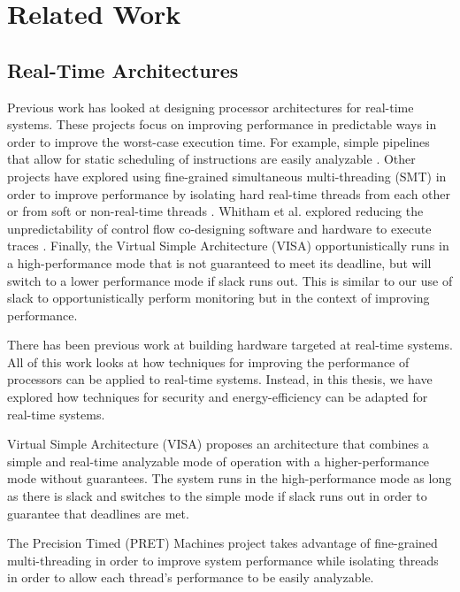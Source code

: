 \chapter{Related Work}
\label{chap:related_work}

\section{Real-Time Architectures}
\label{sec:related_work.realtime}

Previous work has looked at designing processor architectures for real-time
systems. These projects focus on improving performance in predictable ways in
order to improve the worst-case execution time. For example, simple pipelines
that allow for static scheduling of instructions are easily analyzable
\cite{spear-ecrts03, mcgrep-rtss06, jop-jsa07, patmos-ppes2011}. Other projects
have explored using fine-grained simultaneous multi-threading (SMT) in order to
improve performance by isolating hard real-time threads from each other
\cite{pret-dac07, pret-cases08, ptarm-iccd12} or from soft or non-real-time
threads \cite{merasa-micro10, carcores-arcs10, flexpret-rtas14}. Whitham et al.
explored reducing the unpredictability of control flow co-designing software
and hardware to execute traces \cite{whitham-comp10}. Finally, the Virtual
Simple Architecture (VISA) \cite{visa-isca03, multi_task_visa-rtss04}
opportunistically runs in a high-performance mode that is not guaranteed to
meet its deadline, but will switch to a lower performance mode if slack runs
out. This is similar to our use of slack to opportunistically perform
monitoring but in the context of improving performance.

There has been previous work at building hardware targeted at real-time
systems. All of this work looks at how techniques for improving the performance
of processors can be applied to real-time systems. Instead, in this thesis, we
have explored how techniques for security and energy-efficiency can be adapted
for real-time systems.

Virtual Simple Architecture (VISA) \cite{visa-isca03,
multi_task_visa-rtss04} proposes an architecture that combines a simple and
real-time analyzable mode of operation with a higher-performance mode
without guarantees. The system runs in the high-performance mode as long as
there is slack and switches to the simple mode if slack runs out in order to
guarantee that deadlines are met.

The Precision Timed (PRET) Machines project \cite{pret-dac07, pret-cases08,
ptarm-iccd12, flexpret-rtas14} takes advantage of fine-grained multi-threading
in order to improve system performance while isolating threads in order to
allow each thread's performance to be easily analyzable.

